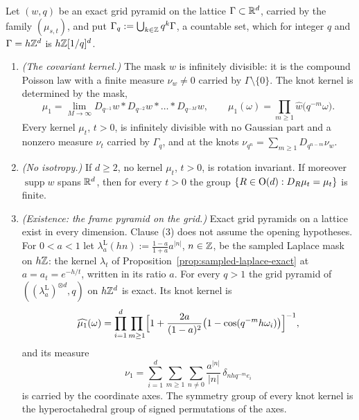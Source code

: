 \begin{proposition}
\label{prop:grid-pyramid-not-isotropic}

Let $(w, q)$ be an exact grid pyramid on the lattice $\Gamma \subset \mathbb{R}^d$, carried by the family
$(\mu_{s,t})$, and put $\Gamma_q := \bigcup_{k \in \mathbb{Z}}q^k\Gamma$, a countable set, which for
integer $q$ and $\Gamma = h\mathbb{Z}^d$ is $h\mathbb{Z}[1/q]^d$.
\begin{enumerate}
\item \emph{(The covariant kernel.)} The mask $w$ is infinitely divisible: it is the compound
Poisson law with a finite \Levy{} measure $\nu_w \ne 0$ carried by $\Gamma \setminus \{0\}$. The
knot kernel is determined by the mask,
\begin{equation}\label{eq:knot-product}
\mu_1 = \lim_{M \to \infty} D_{q^{-1}}w * D_{q^{-2}}w * \dots * D_{q^{-M}}w, \qquad
\widehat{\mu_1}(\omega) = \prod_{m \ge 1}\widehat{w}\bigl(q^{-m}\omega\bigr).
\end{equation}
Every kernel $\mu_t$, $t > 0$, is infinitely divisible with no Gaussian part and a nonzero \Levy{}
measure $\nu_t$ carried by $\Gamma_q$, and at the knots
$\nu_{q^n} = \sum_{m \ge 1} D_{q^{n-m}}\nu_w$.
\item \emph{(No isotropy.)} If $d \ge 2$, no kernel $\mu_t$, $t > 0$, is rotation invariant. If
moreover $\operatorname{supp} w$ spans $\mathbb{R}^d$, then for every $t > 0$ the group
$\{R \in \mathrm{O}(d) : D_R\mu_t = \mu_t\}$ is finite.
\item \emph{(Existence: the frame \Matern{} pyramid on the grid.)} Exact grid pyramids on a lattice exist in every dimension. Clause (3) does not assume the opening hypotheses. For $0 < a < 1$ let $\lambda^{\mathrm L}_a(hn) := \tfrac{1-a}{1+a}a^{|n|}$, $n \in \mathbb{Z}$,
be the sampled Laplace mask on $h\mathbb{Z}$: the kernel $\lambda_t$ of
Proposition~\ref{prop:sampled-laplace-exact} at $a = a_t = e^{-h/t}$, written in its ratio $a$. For
every $q > 1$ the grid pyramid of $((\lambda^{\mathrm L}_a)^{\otimes d}, q)$ on $h\mathbb{Z}^d$ is exact.
Its knot kernel is
\[
\widehat{\mu_1}(\omega) = \prod_{i=1}^d\prod_{m \ge 1}\Bigl[1 + \frac{2a}{(1-a)^2}
\bigl(1 - \cos(q^{-m}h\omega_i)\bigr)\Bigr]^{-1},
\]
and its \Levy{} measure
\begin{equation}\label{eq:frame-levy}
\nu_1 = \sum_{i=1}^{d}\sum_{m \ge 1}\sum_{n \ne 0}\frac{a^{|n|}}{|n|}\,\delta_{nhq^{-m}e_i}
\end{equation}
is carried by the coordinate axes. The symmetry group of every knot kernel is the hyperoctahedral
group of signed permutations of the axes.
\end{enumerate}
\end{proposition}

